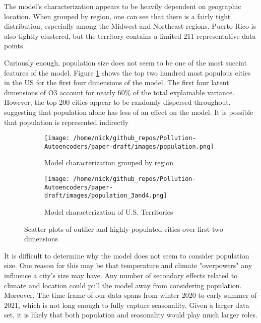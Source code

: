 \documentclass{article}
\begin{document}
\par The model's characterization appears to be heavily dependent on geographic location. When grouped by region, one can see that there is a fairly tight distribution, especially among the Midwest and Northeast regions. Puerto Rico is also tightly clustered, but the territory contains a limited 211 representative data points.

\par Curiously enough, population size does not seem to be one of the most succint features of the model. Figure \ref{fig:population_comparison} shows the top two hundred most populous cities in the US for the first four dimensions of the model. The first four latent dimensions of O3 account for nearly 60\% of the total explainable variance. However, the top 200 cities appear to be randomly dispersed throughout, suggesting that population alone has less of an effect on the model. It is possible that population is represented indirectly

\begin{figure}[h!]
\begin{subfigure}{0.5\textwidth}
    \texttt{[image: /home/nick/github\_repos/Pollution-Autoencoders/paper-draft/images/population.png]} 
    \caption{Model characterization grouped by region}
\end{subfigure}
\begin{subfigure}{0.5\textwidth}
    \texttt{[image: /home/nick/github\_repos/Pollution-Autoencoders/paper-draft/images/population\_3and4.png]}
    \caption{Model characterization of U.S. Territories}
\end{subfigure}
\caption{Scatter plots of outlier and highly-populated cities over first two dimensions}
\label{fig:population_comparison}
\end{figure}

\par It is difficult to determine why the model does not seem to consider population size. One reason for this may be that temperature and climate "overpowers" any influence a city's size may have. Any number of secondary effects related to climate and location could pull the model away from considering population. Moreover, The time frame of our data spans from winter 2020 to early summer of 2021, which is not long enough to fully capture seasonality. Given a larger data set, it is likely that both population and seasonality would play much larger roles.
\end{document}
